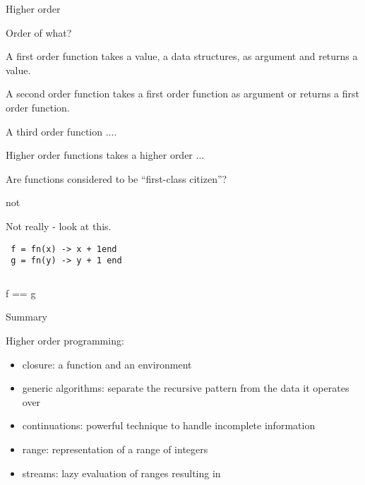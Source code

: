 \begin{frame}{Higher order}

Order of what?

\pause\vspace{20pt}
A first order function takes a value, a data structures, as argument and returns a value.

\pause\vspace{20pt}
A second order function takes a first order function as argument or returns a first order function.

\pause\vspace{20pt}
A third order function ....

\pause\vspace{20pt}
Higher order functions takes a higher order ...

\pause\vspace{20pt}
Are functions considered to be ``first-class citizen''?
\end{frame}

\begin{frame}[fragile]{not}
    
  \vspace{20pt}Not really - look at this.
    
\begin{verbatim}
 f = fn(x) -> x + 1end
 g = fn(y) -> y + 1 end
\end{verbatim}
\vspace{20pt}\pause
\begin{verbatim}
\end{verbatim}
  f == g 
\end{frame}


\begin{frame}{Summary}

\pause Higher order programming:

\begin{itemize}
\pause\item {closure}: a function and an environment
\pause\item {generic algorithms}: separate the recursive pattern from the data it operates over
\pause\item {continuations}: powerful technique to handle incomplete information
\pause\item {range}: representation of a range of integers
\pause\item {streams}: lazy evaluation of ranges resulting in 
\end{itemize}


\end{frame}






